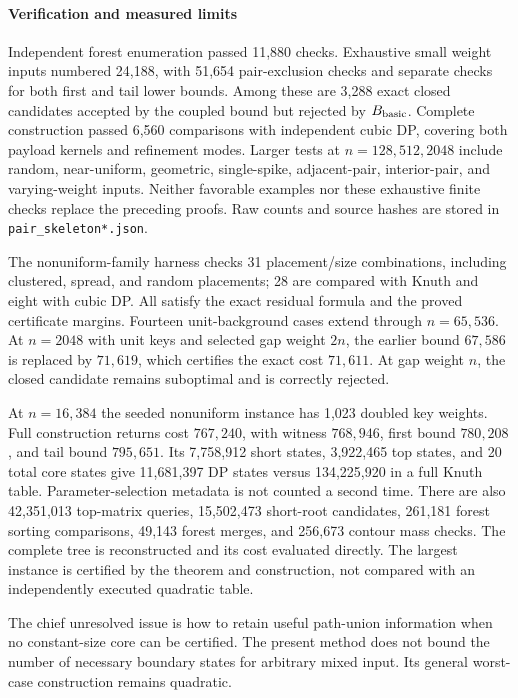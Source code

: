 \documentclass[11pt]{article}
\begin{document}
\paragraph{Verification and measured limits}\label{sec:legacy-13-2}
Independent forest enumeration passed 11,880 checks. Exhaustive small
weight inputs numbered 24,188, with 51,654 pair-exclusion checks and
separate checks for both first and tail lower bounds. Among these are
3,288 exact closed candidates accepted by the coupled bound but rejected
by $B_{\rm basic}$. Complete construction passed 6,560 comparisons with
independent cubic DP, covering both payload kernels and refinement modes.
Larger tests at $n=128,512,2048$ include random, near-uniform, geometric,
single-spike, adjacent-pair, interior-pair, and varying-weight inputs.
Neither favorable examples nor these exhaustive finite checks replace
the preceding proofs. Raw counts and source hashes are stored in
\texttt{pair\_skeleton*.json}.

The nonuniform-family harness checks 31 placement/size combinations,
including clustered, spread, and random placements; 28 are compared with
Knuth and eight with cubic DP. All satisfy the exact residual formula
and the proved certificate margins. Fourteen unit-background cases
extend through $n=65,536$. At $n=2048$ with unit keys and selected gap
weight $2n$, the earlier bound $67,586$ is replaced by $71,619$, which
certifies the exact cost $71,611$. At gap weight $n$, the closed
candidate remains suboptimal and is correctly rejected.

At $n=16,384$ the seeded nonuniform instance has 1,023 doubled key
weights. Full construction returns cost $767,240$, with witness
$768,946$, first bound $780,208$, and tail bound $795,651$.
Its 7,758,912 short states, 3,922,465 top states, and 20 total core
states give 11,681,397 DP states versus 134,225,920 in a full Knuth
table. Parameter-selection metadata is not counted a second time.
There are also 42,351,013 top-matrix queries, 15,502,473 short-root
candidates, 261,181 forest sorting comparisons, 49,143 forest merges,
and 256,673 contour mass checks. The complete tree is reconstructed
and its cost evaluated directly. The largest instance is certified by the theorem and construction,
not compared with an independently executed quadratic table.





The chief unresolved issue is how to retain useful path-union information
when no constant-size core can be certified. The present method does
not bound the number of necessary boundary states for arbitrary mixed
input. Its general worst-case construction remains quadratic.
\end{document}
